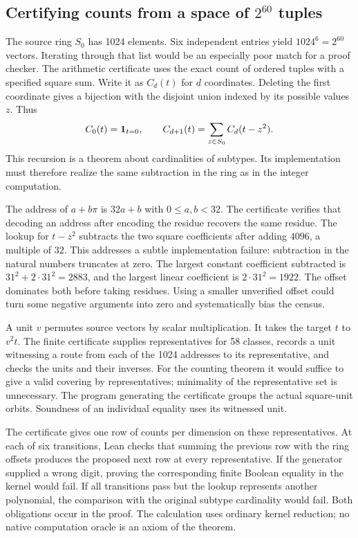\documentclass[12pt,letterpaper]{article}
\begin{document}
\subsection{Certifying counts from a space of $2^{60}$ tuples}
The source ring $S_0$ has 1024 elements. Six independent entries yield $1024^6=2^{60}$ vectors. Iterating through that list would be an especially poor match for a proof checker. The arithmetic certificate uses the exact count of ordered tuples with a specified square sum. Write it as $C_d(t)$ for $d$ coordinates. Deleting the first coordinate gives a bijection with the disjoint union indexed by its possible values $z$. Thus
\[
 C_0(t)={\bf1}_{t=0},\qquad C_{d+1}(t)=\sum_{z\in S_0}C_d(t-z^2).
\]
This recursion is a theorem about cardinalities of subtypes. Its implementation must therefore realize the same subtraction in the ring as in the integer computation.
\par
The address of $a+b\pi$ is $32a+b$ with $0\leq a,b<32$. The certificate verifies that decoding an address after encoding the residue recovers the same residue. The lookup for $t-z^2$ subtracts the two square coefficients after adding $4096$, a multiple of $32$. This addresses a subtle implementation failure: subtraction in the natural numbers truncates at zero. The largest constant coefficient subtracted is $31^2+2\cdot31^2=2883$, and the largest linear coefficient is $2\cdot31^2=1922$. The offset dominates both before taking residues. Using a smaller unverified offset could turn some negative arguments into zero and systematically bias the census.
\par
A unit $v$ permutes source vectors by scalar multiplication. It takes the target $t$ to $v^2t$. The finite certificate supplies representatives for 58 classes, records a unit witnessing a route from each of the 1024 addresses to its representative, and checks the units and their inverses. For the counting theorem it would suffice to give a valid covering by representatives; minimality of the representative set is unnecessary. The program generating the certificate groups the actual square-unit orbits. Soundness of an individual equality uses its witnessed unit.
\par
The certificate gives one row of counts per dimension on these representatives. At each of six transitions, Lean checks that summing the previous row with the ring offsets produces the proposed next row at every representative. If the generator supplied a wrong digit, proving the corresponding finite Boolean equality in the kernel would fail. If all transitions pass but the lookup represents another polynomial, the comparison with the original subtype cardinality would fail. Both obligations occur in the proof. The calculation uses ordinary kernel reduction; no native computation oracle is an axiom of the theorem.
\end{document}

